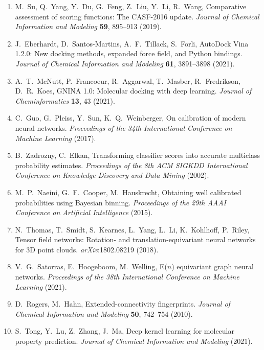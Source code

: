 \documentclass{article}
\begin{document}
\begin{enumerate}[leftmargin=2em,itemsep=1pt,label=\textit{\arabic*}.]
\item M.~Su, Q.~Yang, Y.~Du, G.~Feng, Z.~Liu, Y.~Li, R.~Wang,
  Comparative assessment of scoring functions: The CASF-2016 update.
  \textit{Journal of Chemical Information and Modeling} \textbf{59},
  895--913 (2019).

\item J.~Eberhardt, D.~Santos-Martins, A.~F.~Tillack,
  S.~Forli,
  AutoDock Vina 1.2.0: New docking methods, expanded force field, and
  Python bindings.
  \textit{Journal of Chemical Information and Modeling} \textbf{61},
  3891--3898 (2021).

\item A.~T.~McNutt, P.~Francoeur, R.~Aggarwal, T.~Masber,
  R.~Fredrikson, D.~R.~Koes,
  GNINA 1.0: Molecular docking with deep learning.
  \textit{Journal of Cheminformatics} \textbf{13}, 43 (2021).

\item C.~Guo, G.~Pleiss, Y.~Sun, K.~Q.~Weinberger,
  On calibration of modern neural networks.
  \textit{Proceedings of the 34th International Conference on
  Machine Learning} (2017).

\item B.~Zadrozny, C.~Elkan,
  Transforming classifier scores into accurate multiclass probability
  estimates.
  \textit{Proceedings of the 8th ACM SIGKDD International Conference
  on Knowledge Discovery and Data Mining} (2002).

\item M.~P.~Naeini, G.~F.~Cooper, M.~Hauskrecht,
  Obtaining well calibrated probabilities using Bayesian binning.
  \textit{Proceedings of the 29th AAAI Conference on Artificial
  Intelligence} (2015).

\item N.~Thomas, T.~Smidt, S.~Kearnes, L.~Yang, L.~Li,
  K.~Kohlhoff, P.~Riley,
  Tensor field networks: Rotation- and translation-equivariant neural
  networks for 3D point clouds.
  \textit{arXiv}:1802.08219 (2018).

\item V.~G.~Satorras, E.~Hoogeboom, M.~Welling,
  E($n$) equivariant graph neural networks.
  \textit{Proceedings of the 38th International Conference on Machine
  Learning} (2021).

\item D.~Rogers, M.~Hahn,
  Extended-connectivity fingerprints.
  \textit{Journal of Chemical Information and Modeling} \textbf{50},
  742--754 (2010).

\item S.~Tong, Y.~Lu, Z.~Zhang, J.~Ma,
  Deep kernel learning for molecular property prediction.
  \textit{Journal of Chemical Information and Modeling} (2021).


\end{enumerate}
\end{document}
